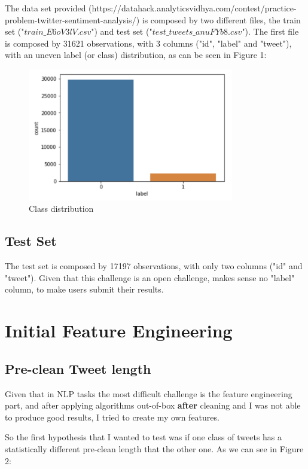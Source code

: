 \documentclass{article}
\begin{document}
	The data set provided (https://datahack.analyticsvidhya.com/contest/practice-problem-twitter-sentiment-analysis/) is composed by two different files, the train set ("$train\_E6oV3lV.csv$") and test set ("$test\_tweets\_anuFYb8.csv$"). The first file is composed by 31621 observations, with 3 columns ("id", "label" and "tweet"), with an uneven label (or class) distribution, as can be seen in Figure 1:
	
	\begin{figure}[h]
		\label{Figure 1}
		\caption{Class distribution}
		\includegraphics[width=9cm]{classes.png}
		\centering
	\end{figure}
	
	\subsection{Test Set}
	
	The test set is composed by 17197 observations, with only two columns ("id" and "tweet"). Given that this challenge is an open challenge, makes sense no "label" column, to make users submit their results. 
	
	\section{Initial Feature Engineering}
	
	\subsection{Pre-clean Tweet length}
	
	Given that in NLP tasks the most difficult challenge is the feature engineering part, and after applying algorithms out-of-box \textbf{after} cleaning and I was not able to produce good results, I tried to create my own features. 
	
	So the first hypothesis that I wanted to test was if one class of tweets has a statistically different pre-clean length that the other one. As we can see in Figure 2:
	
\end{document}
